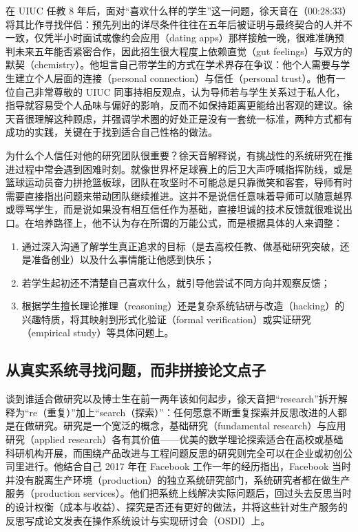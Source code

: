 \documentclass[UTF8,a4paper,11pt,fontset=fandol]{ctexart}
\begin{document}
在 UIUC 任教 8 年后，面对“喜欢什么样的学生”这一问题，徐天音在（00:28:33）将其比作寻找伴侣：预先列出的详尽条件往往在五年后被证明与最终契合的人并不一致，仅凭半小时面试或像约会应用（dating apps）那样接触一晚，很难准确预判未来五年能否紧密合作，因此招生很大程度上依赖直觉（gut feelings）与双方的默契（chemistry）。他坦言自己带学生的方式在学术界存在争议：他个人需要与学生建立个人层面的连接（personal connection）与信任（personal trust）。他有一位自己非常尊敬的 UIUC 同事持相反观点，认为导师若与学生关系过于私人化，指导就容易受个人品味与偏好的影响，反而不如保持距离更能给出客观的建议。徐天音很理解这种顾虑，并强调学术圈的好处正是没有一套统一标准，两种方式都有成功的实践，关键在于找到适合自己性格的做法。

为什么个人信任对他的研究团队很重要？徐天音解释说，有挑战性的系统研究在推进过程中常会遇到困难时刻。就像世界杯足球赛上的后卫大声呼喊指挥防线，或是篮球运动员奋力拼抢篮板球，团队在攻坚时不可能总是只靠微笑和客套，导师有时需要直接指出问题来带动团队继续推进。这并不是说信任意味着导师可以随意越界或辱骂学生，而是说如果没有相互信任作为基础，直接坦诚的技术反馈就很难说出口。在培养路径上，他不认为存在所谓的万能公式，而是根据具体的人来调整：
\begin{enumerate}
\item 通过深入沟通了解学生真正追求的目标（是去高校任教、做基础研究突破，还是准备创业）以及什么事情能让他感到快乐；
\item 若学生起初还不清楚自己喜欢什么，就引导他尝试不同方向并观察反馈；
\item 根据学生擅长理论推理（reasoning）还是复杂系统钻研与改造（hacking）的兴趣特质，将其映射到形式化验证（formal verification）或实证研究（empirical study）等具体问题上。
\end{enumerate}

\subsection{从真实系统寻找问题，而非拼接论文点子}
谈到谁适合做研究以及博士生在前一两年该如何起步，徐天音把“research”拆开解释为“re（重复）”加上“search（探索）”：任何愿意不断重复探索并反思改进的人都是在做研究。研究是一个宽泛的概念，基础研究（fundamental research）与应用研究（applied research）各有其价值——优美的数学理论探索适合在高校或基础科研机构开展，而围绕产品改进与工程问题反思的研究则完全可以在企业或初创公司里进行。他结合自己 2017 年在 Facebook 工作一年的经历指出，Facebook 当时并没有脱离生产环境（production）的独立系统研究部门，系统研究者都在做生产服务（production services）。他们把系统上线解决实际问题后，回过头去反思当时的设计权衡（成本与收益）、探究是否还有更好的做法，并将这些针对生产服务的反思写成论文发表在操作系统设计与实现研讨会（OSDI）上。
\end{document}
